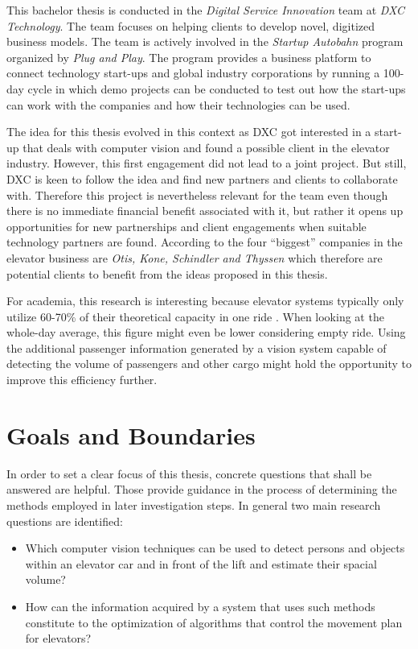 This bachelor thesis is conducted in the \emph{Digital Service Innovation} team at \emph{DXC Technology}.
The team focuses on helping clients to develop novel, digitized business models.
The team is actively involved in the \emph{Startup Autobahn} program organized by \emph{Plug and Play}.
The program provides a business platform to connect technology start-ups and global industry corporations
by running a 100-day cycle in which demo projects can be conducted to test out how the start-ups can work with the companies and how their technologies can be used.

The idea for this thesis evolved in this context as DXC got interested in a start-up that deals with computer vision and found a possible client in the elevator industry.
However, this first engagement did not lead to a joint project.
But still, DXC is keen to follow the idea and find new partners and clients to collaborate with.
Therefore this project is nevertheless relevant for the team even though there is no immediate financial benefit associated with it, 
but rather it opens up opportunities for new partnerships and client engagements when suitable technology partners are found.
According to \textcite[][p.~4]{unger2015aufzuege} the four \enquote{biggest} companies in the elevator business are \emph{Otis, Kone, Schindler and Thyssen} which therefore are potential clients to benefit from the ideas proposed in this thesis.

For academia, this research is interesting because elevator systems typically only utilize
60-70\% of their theoretical capacity in one ride \autocite[][p.~194]{unger2015aufzuege}. 
When looking at the whole-day average, this figure might even be lower considering empty ride.
Using the additional passenger information generated by a vision system capable of detecting the volume of passengers and other cargo might hold the opportunity to improve this efficiency further.

\section{Goals and Boundaries}
\label{sec:intro:goals}

In order to set a clear focus of this thesis, concrete questions that shall be answered are helpful.
Those provide guidance in the process of determining the methods employed in later investigation steps.
In general two main research questions are identified:

\begin{itemize}
    \item Which computer vision techniques can be used to detect persons and objects within an elevator car and in front of the lift and estimate their spacial volume?
    \item How can the information acquired by a system that uses such methods constitute to the optimization of algorithms that control the movement plan for elevators?
\end{itemize}


